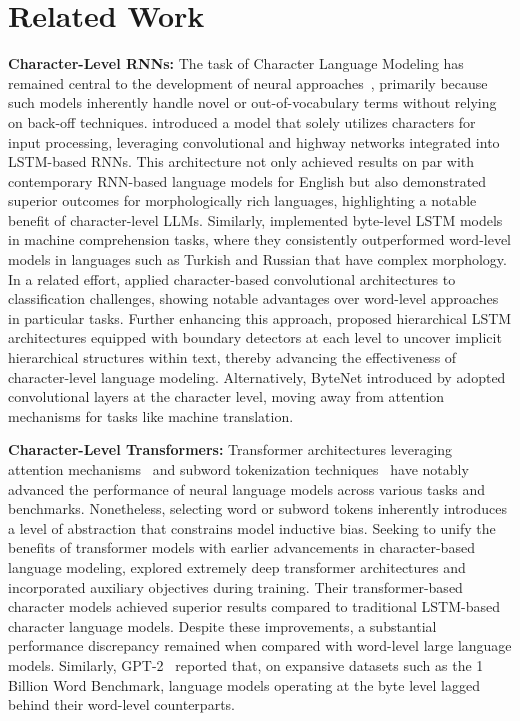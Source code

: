 \section{Related Work}
\label{section:related_work}

\textbf{Character-Level RNNs:} The task of Character Language Modeling has remained central to the development of neural approaches~\citep{sutskever2011generating,mikolov2012subword,graves2013generating}, primarily because such models inherently handle novel or out-of-vocabulary terms without relying on back-off techniques. \cite{kim2016character} introduced a model that solely utilizes characters for input processing, leveraging convolutional and highway networks integrated into LSTM-based RNNs. This architecture not only achieved results on par with contemporary RNN-based language models for English but also demonstrated superior outcomes for morphologically rich languages, highlighting a notable benefit of character-level LLMs. Similarly, \cite{kenter2018byte} implemented byte-level LSTM models in machine comprehension tasks, where they consistently outperformed word-level models in languages such as Turkish and Russian that have complex morphology. In a related effort, \cite{zhang2015character} applied character-based convolutional architectures to classification challenges, showing notable advantages over word-level approaches in particular tasks. Further enhancing this approach, \citet{chung2019hierarchical} proposed hierarchical LSTM architectures equipped with boundary detectors at each level to uncover implicit hierarchical structures within text, thereby advancing the effectiveness of character-level language modeling. Alternatively, ByteNet introduced by \cite{kalchbrenner2016neural} adopted convolutional layers at the character level, moving away from attention mechanisms for tasks like machine translation.

\textbf{Character-Level Transformers:} Transformer architectures leveraging attention mechanisms~\citep{vaswani2017attention} and subword tokenization techniques~\citep{sennrich-etal-2016-neural} have notably advanced the performance of neural language models across various tasks and benchmarks. Nonetheless, selecting word or subword tokens inherently introduces a level of abstraction that constrains model inductive bias. Seeking to unify the benefits of transformer models with earlier advancements in character-based language modeling, \citet{al2019character} explored extremely deep transformer architectures and incorporated auxiliary objectives during training. Their transformer-based character models achieved superior results compared to traditional LSTM-based character language models. Despite these improvements, a substantial performance discrepancy remained when compared with word-level large language models. Similarly, GPT-2~\citep{radfordgpt2} reported that, on expansive datasets such as the 1 Billion Word Benchmark, language models operating at the byte level lagged behind their word-level counterparts.

